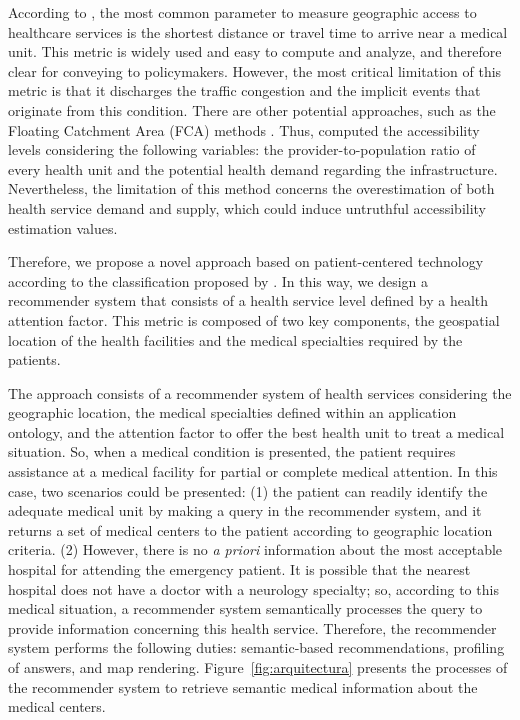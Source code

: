 \documentclass[sustainability,article,submit,pdftex,moreauthors]{Definitions/mdpi}
\begin{document}
According to \citet{neutens2015accessibility}, the most common parameter to measure geographic access to healthcare services is the shortest distance or travel time to arrive near a medical unit. This metric is widely used and easy to compute and analyze, and therefore clear for conveying to policymakers. However, the most critical limitation of this metric is that it discharges the traffic congestion and the implicit events that originate from this condition. There are other potential approaches, such as the Floating Catchment Area (FCA) methods \citep{matthews2019using}. Thus, \citet{matthews2019using} computed the accessibility levels considering the following variables: the provider-to-population ratio of every health unit and the potential health demand regarding the infrastructure. Nevertheless, the limitation of this method concerns the overestimation of both health service demand and supply, which could induce untruthful accessibility estimation values.

Therefore, we propose a novel approach based on patient-centered technology according to the classification proposed by \citet{kraus2021digital}. In this way, we design a recommender system that consists of a health service level defined by a health attention factor. This metric is composed of two key components, the geospatial location of the health facilities and the medical specialties required by the patients. 

The approach consists of a recommender system of health services considering the geographic location, the medical specialties defined within an application ontology, and the attention factor to offer the best health unit to treat a medical situation. So, when a medical condition is presented, the patient requires assistance at a medical facility for partial or complete medical attention. In this case, two scenarios could be presented: (1) the patient can readily identify the adequate medical unit by making a query in the recommender system, and it returns a set of medical centers to the patient according to geographic location criteria. (2) However, there is no \textit{a priori} information about the most acceptable hospital for attending the emergency patient. It is possible that the nearest hospital does not have a doctor with a neurology specialty; so, according to this medical situation, a recommender system semantically processes the query to provide information concerning this health service. Therefore, the recommender system performs the following duties: semantic-based recommendations, profiling of answers, and map rendering. Figure~\ref{fig:arquitectura} presents the processes of the recommender system to retrieve semantic medical information about the medical centers.
\end{document}
